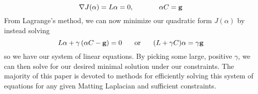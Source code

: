 \[\nabla J(\alpha)=L\alpha=0,\hspace{.5in}\alpha C=\textbf{g}\]
From Lagrange's method, we can now minimize our quadratic form $J(\alpha)$ by instead solving
\[L\alpha+\gamma\left(\alpha C-\textbf{g}\right) = 0
	\hspace{.2in}\text{ or }\hspace{.2in}
	(L+\gamma C)\alpha = \gamma \textbf{g}\]
so we have our system of linear equations. By picking some large, positive $\gamma$, we can then solve for our desired minimal solution under our constraints. The majority of this paper is devoted to methods for efficiently solving this system of equations for any given Matting Laplacian and sufficient constraints.